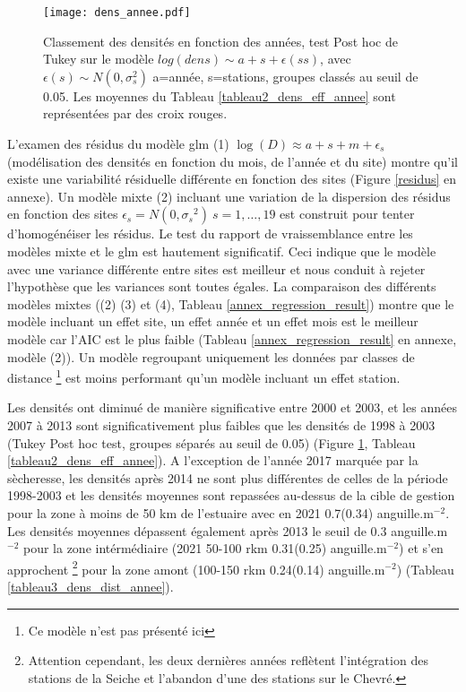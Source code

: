 \documentclass[10pt,twocolumn,titlepage,twoside]{article}\usepackage[]{graphicx}\usepackage[]{color}
\begin{document}
\begin{figure}[htbp]
\centering
 \texttt{[image: dens\_annee.pdf]} 
\caption[Tendance des densités modèle]{Classement des densités en fonction des
années, test Post hoc de Tukey sur le modèle $log(dens) \sim a +s +
\epsilon(ss)$, avec $\epsilon(s) \sim N(0,\sigma_s^2)$ a=année, s=stations,
groupes classés au seuil de 0.05. Les moyennes du Tableau
\ref{tableau2_dens_eff_annee} sont représentées par des croix rouges.
}
\label{dens_annee}
\end{figure}

L'examen des résidus du modèle glm (1) $\log
(D){\approx}a+s+m+\epsilon_s$ (modélisation des densités en fonction du mois, de
l'année et du site) montre qu'il existe une variabilité résiduelle différente en fonction des sites (Figure \ref{residus} en annexe).  Un
modèle mixte (2) incluant une variation de la dispersion des résidus en fonction
des sites $\epsilon_s=N(0,{\sigma_{s}}^2) ~s=1,\dots,19$
\citep{zuur_mixed_2009} est construit pour tenter d'homogénéiser les résidus. Le
test du rapport de vraissemblance entre les modèles mixte et le glm est
hautement significatif. Ceci indique que le modèle avec une variance différente entre
sites est meilleur et nous conduit à rejeter l'hypothèse que les variances sont
toutes égales.
La comparaison des différents modèles mixtes ((2) (3) et (4), Tableau
\ref{annex_regression_result}) montre
que le modèle incluant un effet site, un effet année et un effet mois est le
meilleur modèle car l'AIC est le plus faible (Tableau
\ref{annex_regression_result} en annexe, modèle (2)). Un modèle regroupant
uniquement les données par classes de distance \footnote{Ce modèle n'est pas présenté ici} est moins performant
qu'un modèle incluant un effet station.

Les densités ont diminué de manière
significative entre 2000 et 2003, et les années 2007 à 2013
sont significativement plus faibles que les densités de 1998 à 2003 (Tukey
Post hoc test, groupes séparés au seuil de 0.05) (Figure \ref{dens_annee},
Tableau \ref{tableau2_dens_eff_annee}).
A l'exception de l'année 2017 marquée par la sècheresse, les densités après 2014
ne sont plus différentes de celles de la période 1998-2003 et les densités moyennes sont
repassées au-dessus de la cible de gestion pour la zone à moins de 50 km de
l'estuaire avec en 2021 0.7(0.34) anguille.m$^{-2}$. Les
densités moyennes dépassent également après 2013 le seuil de 0.3
anguille.m$^{-2}$ pour la zone intérmédiaire (2021 50-100 rkm 0.31(0.25)
anguille.m$^{-2}$) et s'en approchent \footnote{Attention cependant, les deux
dernières années reflètent l'intégration des stations de la Seiche et l'abandon d'une des
stations sur le Chevré.} pour la zone amont (100-150 rkm
0.24(0.14) anguille.m$^{-2}$) (Tableau \ref{tableau3_dens_dist_annee}). 
\end{document}
